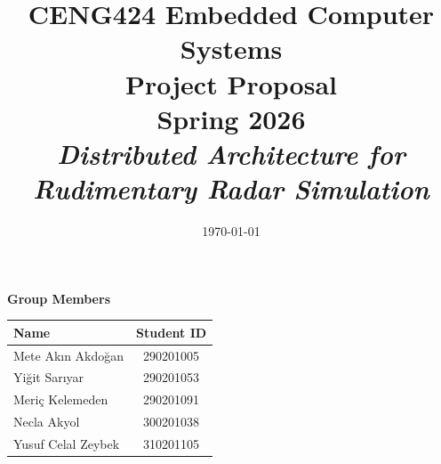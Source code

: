 \documentclass[14pt]{article}
\title{{\bf CENG424 Embedded Computer Systems\\ Project Proposal \\ Spring 2026} \\
	\it Distributed Architecture for Rudimentary Radar Simulation}
\date{\today}
\begin{document}
\pagestyle{plain}
\maketitle



\begin{center}
\textbf{Group Members}\\[0.8em]
\renewcommand{\arraystretch}{1.4}
\begin{tabular}{|l|c|}
\hline
\textbf{Name} & \textbf{Student ID} \\
\hline
Mete Akın Akdoğan   & 290201005 \\
Yiğit Sarıyar       & 290201053 \\
Meriç Kelemeden     & 290201091 \\
Necla Akyol         & 300201038 \\
Yusuf Celal Zeybek  & 310201105 \\
\hline
\end{tabular}
\end{center}



\cleardoublepage
{}
\end{document}
